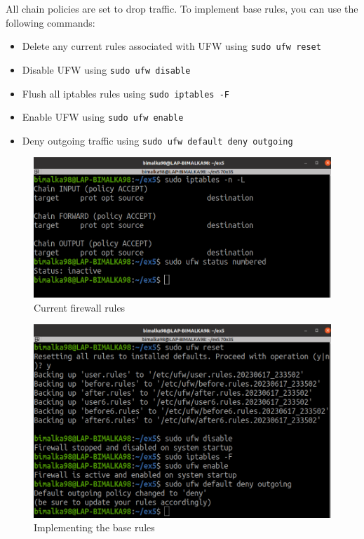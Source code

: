 \documentclass[11pt,letterpaper]{article}
\begin{document}
\begin{enumerate}
		All chain policies are set to drop traffic. To implement base rules, you can use the following commands:
		
		\begin{itemize}
			\item Delete any current rules associated with UFW using \texttt{sudo ufw reset}
			\item Disable UFW using \texttt{sudo ufw disable}
			\item Flush all iptables rules using \texttt{sudo iptables -F}
			\item Enable UFW using \texttt{sudo ufw enable}
			\item Deny outgoing traffic using \texttt{sudo ufw default deny outgoing}
		\end{itemize}
	
		\begin{figure}[H]
			\centering
			\includegraphics[width=0.75\columnwidth]{images/part2/1.png}
			\caption{Current firewall rules}
		\end{figure}
		
		\begin{figure}[H]
			\centering
			\includegraphics[width=0.75\columnwidth]{images/part2/2.png}
			\caption{Implementing the base rules}
		\end{figure}
		

\end{enumerate}
\end{document}
